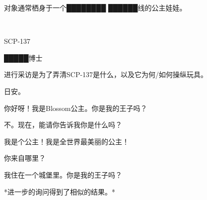 对象通常栖身于一个████████ ██████线的公主娃娃。

\\

SCP-137

█████博士

进行采访是为了弄清SCP-137是什么，以及它为何\slash 如何操纵玩具。


日安。

你好呀！我是Blossom公主。你是我的王子吗？

不。现在，能请你告诉我你是什么吗？

我是个公主！我是全世界最美丽的公主！

你来自哪里？

我住在一个城堡里。你是我的王子吗？

*进一步的询问得到了相似的结果。*


\newpage

